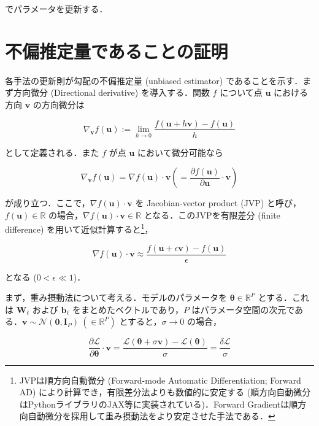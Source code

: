 \documentclass[11pt,a4paper]{jsarticle}
\begin{document}
でパラメータを更新する．

\section{不偏推定量であることの証明}
各手法の更新則が勾配の不偏推定量 (unbiased estimator) であることを示す．まず方向微分 (Directional derivative) を導入する．関数 $f$ について点 $\mathbf{u}$ における方向 $\mathbf{v}$ の方向微分は

\begin{equation}
\nabla_\mathbf{v}f(\mathbf{u}):= \lim_{h\to 0} \frac{f(\mathbf{u}+h\mathbf{v}) - f(\mathbf{u})}{h}
\end{equation}

として定義される．また $f$ が点 $\mathbf{u}$ において微分可能なら

\begin{equation}
\nabla_\mathbf{v}f(\mathbf{u})=\nabla f(\mathbf{u})\cdot \mathbf{v}\left(=\frac{\partial f(\mathbf{u})}{\partial \mathbf{u}}\cdot \mathbf{v}\right)
\end{equation}

が成り立つ．ここで，$\nabla f(\mathbf{u})\cdot \mathbf{v}$ を Jacobian-vector product (JVP) と呼び，$f(\mathbf{u})\in \mathbb{R}$ の場合，$\nabla f(\mathbf{u})\cdot \mathbf{v}\in \mathbb{R}$ となる．このJVPを有限差分 (finite difference) を用いて近似計算すると\footnote{JVPは順方向自動微分 (Forward-mode Automatic Differentiation; Forward AD) により計算でき，有限差分法よりも数値的に安定する (順方向自動微分はPythonライブラリのJAX等に実装されている)．Forward Gradientは順方向自動微分を採用して重み摂動法をより安定させた手法である．}，

\begin{equation}
\nabla f(\mathbf{u})\cdot \mathbf{v} \approx \frac{f(\mathbf{u}+\epsilon \mathbf{v}) - f(\mathbf{u})}{\epsilon}
\end{equation}

となる ($0 < \epsilon \ll 1$)．

まず，重み摂動法について考える．モデルのパラメータを $\boldsymbol{\theta} \in \mathbb{R}^P$ とする．これは $\mathbf{W}_\ell$ および $\mathbf{b}_\ell$ をまとめたベクトルであり，$P$ はパラメータ空間の次元である．$\mathbf{v} \sim \mathcal{N}(\mathbf{0}, \mathbf{I}_P)\ (\in \mathbb{R}^P)$ とすると，$\sigma\to 0$ の場合，

\begin{equation}
\frac{\partial \mathcal{L}}{\partial \boldsymbol{\theta}}\cdot \mathbf{v} = \frac{\mathcal{L}(\boldsymbol{\theta}+\sigma \mathbf{v}) - \mathcal{L}(\boldsymbol{\theta})}{\sigma}=\frac{\delta \mathcal{L}}{\sigma}
\end{equation}
\end{document}
